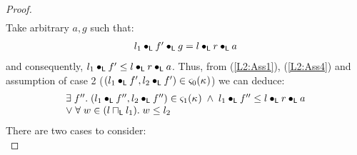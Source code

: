 \begin{lemma}[]
\begin{proof}
\[\begin{array}{l}
\end{array}
\]
%
Take arbitrary $a, g$ such that:
%
\begin{align}
	\begin{array}{l l}
		l_1 \bullet_{\textsf{L}} f' \bullet_{\textsf{L}} g = l \bullet_{\textsf{L}} r \bullet_{\textsf{L}} a
	\end{array} \label{L2:Assbreak} 
\end{align}
%
and consequently, $l_1 \bullet_{\textsf{L}} f' \leq l \bullet_{\textsf{L}} r \bullet_{\textsf{L}} a$. Thus, from (\ref{L2:Ass1}), (\ref{L2:Ass4}) and assumption of case 2 ($(l_1 \bullet_{\textsf{L}} f', l_2  \bullet_{\textsf{L}} f') \in \varsigma_{0}(\kappa_{})$)  we can deduce:
\begin{align}
\begin{array}{l}
	\exists\; f''.\; (l_1 \bullet_{\textsf{L}} f'', l_2 \bullet_{\textsf{L}} f'') \in \varsigma_{1}(\kappa_{}) \;\land\; l_1 \bullet_{\textsf{L}} f'' \leq l \bullet_{\textsf{L}} r \bullet_{\textsf{L}} a\\
	\lor\; \forall\; w \in (l \sqcap_{\textsf{L}} l_1).\; w \leq l_2
\end{array} \nonumber
\end{align}
%
There are two cases to consider:\\


\end{proof}
\end{lemma}
